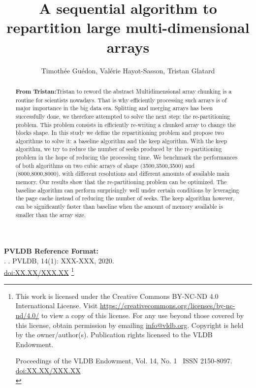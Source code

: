 \documentclass[sigconf, nonacm]{acmart}
\newcommand\vldbdoi{XX.XX/XXX.XX}
\newcommand\vldbpages{XXX-XXX}
\newcommand\vldbvolume{14}
\newcommand\vldbissue{1}
\newcommand\vldbyear{2020}
\newcommand\vldbauthors{\authors}
\newcommand\vldbtitle{\shorttitle}
\newcommand\vldbpagestyle{plain}
\newcommand{\tristan}[1]{\color{orange}\textbf{From Tristan:}#1\color{black}}
\begin{document}
\title{A sequential algorithm to repartition large multi-dimensional arrays}

\author{Timoth\'ee Gu\'edon, Val\'erie Hayot-Sasson, Tristan Glatard}


\begin{abstract}
\tristan{Tristan to reword the abstract}
Multidimensional array chunking is a routine for scientists nowadays.
That is why efficiently processing such arrays is of major importance in the big data era.
Splitting and merging arrays has been successfully done, we therefore attempted
to solve the next step: the re-partitioning problem.
This problem consists in efficiently re-writing a chunked array to change the
blocks shape.
In this study we define the repartitioning problem and propose two algorithms to
solve it: a baseline algorithm and the keep algorithm.
With the keep algorithm, we try to reduce the number of seeks produced by the
re-partitioning problem in the hope of reducing the processing time.
We benchmark the performances of both algorithms on two cubic arrays of shape
(3500,3500,3500) and (8000,8000,8000), with different resolutions and different
amounts of available main memory.
Our results show that the re-partitioning problem can be optimized.
The baseline algorithm can perform surprisingly well under certain conditions
by leveraging the page cache instead of reducing the number of seeks. The keep
algorithm however, can be significantly faster than baseline when the amount of
memory available is smaller than the array size.

\end{abstract}

\maketitle

\pagestyle{\vldbpagestyle}
\begingroup\small\noindent\raggedright\textbf{PVLDB Reference Format:}\\
\vldbauthors. \vldbtitle. PVLDB, \vldbvolume(\vldbissue): \vldbpages, \vldbyear.\\
\href{https://doi.org/\vldbdoi}{doi:\vldbdoi}
\endgroup
\begingroup
\renewcommand\thefootnote{}\footnote{\noindent
This work is licensed under the Creative Commons BY-NC-ND 4.0 International License. Visit \url{https://creativecommons.org/licenses/by-nc-nd/4.0/} to view a copy of this license. For any use beyond those covered by this license, obtain permission by emailing \href{mailto:info@vldb.org}{info@vldb.org}. Copyright is held by the owner/author(s). Publication rights licensed to the VLDB Endowment. \\
\raggedright Proceedings of the VLDB Endowment, Vol. \vldbvolume, No. \vldbissue\ %
ISSN 2150-8097. \\
\href{https://doi.org/\vldbdoi}{doi:\vldbdoi} \\
}\addtocounter{footnote}{-1}\endgroup
\end{document}
